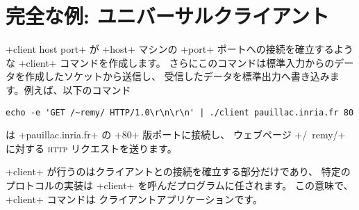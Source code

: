 \section{\label{sec/univclient}完全な例: ユニバーサルクライアント}

\ml+client host port+ が \ml+host+ マシンの \ml+port+ ポートへの接続を確立するような \ml+client+
コマンドを作成します。
さらにこのコマンドは標準入力からのデータを作成したソケットから送信し、
受信したデータを標準出力へ書き込みます。例えば、以下のコマンド
\begin{lstlisting}
echo -e 'GET /~remy/ HTTP/1.0\r\n\r\n' | ./client pauillac.inria.fr 80
\end{lstlisting}
は \ml+pauillac.inria.fr+ の \ml+80+ 版ポートに接続し、
ウェブページ \ml+/~remy/+ に対する \textsc{http} リクエストを送ります。

\ml+client+ が行うのはクライアントとの接続を確立する部分だけであり、
特定のプロトコルの実装は \ml+client+ を呼んだプログラムに任されます。
この意味で、 \ml+client+ コマンドは  クライアントアプリケーションです。

